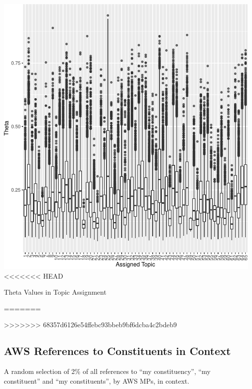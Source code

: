 \documentclass[]{article}
\let\origfigure\figure
\let\endorigfigure\endfigure
\renewenvironment{figure}[1][2] {
    \expandafter\origfigure\expandafter[H]
} {
    \endorigfigure
}
\theoremstyle{definition}
\theoremstyle{definition}
\theoremstyle{definition}
\theoremstyle{remark}
\begin{document}
\begin{table}[H]
\begin{table}[H]
\begin{table}[H]
\begin{table}[H]
\begin{table}[H]
\begin{table}[H]
\begin{table}[H]
\begin{table}[H]
\begin{figure}
\centering
\includegraphics{methodology_files/figure-latex/theta-boxplot-1.pdf}
<<<<<<< HEAD
\caption{\label{fig:theta-boxplot}Theta Values in Topic Assignment}
=======
\caption{\label{k0-theta-boxplot}Theta Values in Topic Assignment}
>>>>>>> 68357d6126e54ffebc93bbeb9bf6dcba4c2bdeb9
\end{figure}

\hypertarget{aws-references-to-constituents-in-context}{%
\subsection{AWS References to Constituents in
Context}\label{aws-references-to-constituents-in-context}}

A random selection of 2\% of all references to ``my constituency'', ``my
constituent'' and ``my constituents'', by AWS MPs, in context.


\end{table}
\end{table}
\end{table}
\end{table}
\end{table}
\end{table}
\end{table}
\end{table}
\end{document}
